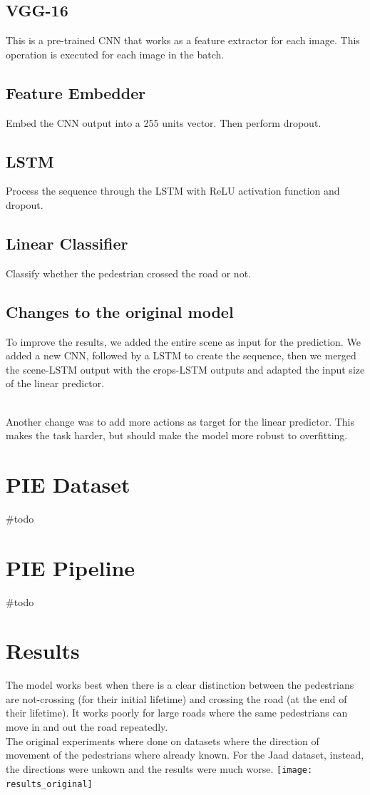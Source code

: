 \documentclass[11pt]{article}
\begin{document}
\subsection*{VGG-16}
This is a pre-trained CNN that works as a feature extractor for each image.
This operation is executed for each image in the batch.
\subsection*{Feature Embedder}
Embed the CNN output into a 255 units vector.
Then perform dropout.

\subsection*{LSTM}
Process the sequence through the LSTM with ReLU activation function and dropout.


\subsection*{Linear Classifier}
Classify whether the pedestrian crossed the road or not.

\subsection*{Changes to the original model}
To improve the results, we added the entire scene as input for the prediction.
We added a new CNN, followed by a LSTM to create the sequence, then we merged the scene-LSTM output with the crops-LSTM
outputs and adapted the input size of the linear predictor.

\\
Another change was to add more actions as target for the linear predictor.
This makes the task harder, but should make the model more robust to overfitting.


\section{PIE Dataset}
\#todo

\section{PIE Pipeline}
\#todo


\section{Results}
    The model works best when there is a clear distinction between the pedestrians are not-crossing (for their initial lifetime)
    and crossing the road (at the end of their lifetime).
    It works poorly for large roads where the same pedestrians can move in and out the road repeatedly.\\
    The original experiments where done on datasets where the direction of movement of the pedestrians where already known.
    For the Jaad dataset, instead, the directions were unkown and the results were much worse.
    \texttt{[image: results\_original]}\\
\end{document}
